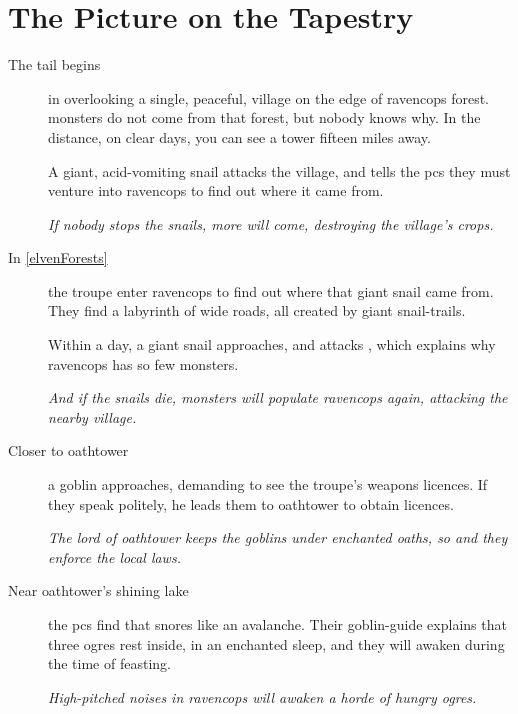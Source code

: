 \enchantedMap[b]

\section*{The Picture on the Tapestry}

\begin{multicols}{2}

\begin{description}
  \item[The tail begins] in  overlooking a single, peaceful, \gls{village} on the edge of \gls{ravencops} forest.
  \Glspl{monster} do not come from that forest, but nobody knows why.
  In the distance, on clear days, you can see a tower fifteen miles away.

  A giant, acid-vomiting snail attacks the \gls{village}, and  tells the \glspl{pc} they must venture into \gls{ravencops} to find out where it came from.

  \textit{If nobody stops the snails, more will come, destroying the \gls{village}'s crops.}

  \item[In \autoref{elvenForests}]
  the troupe enter \gls{ravencops} to find out where that giant snail came from.
  They find a labyrinth of wide roads, all created by giant snail-trails.

  Within a day, a giant snail approaches, and attacks , which explains why \gls{ravencops} has so few monsters.

  \textit{And if the snails die, \glspl{monster} will populate \gls{ravencops} again, attacking the nearby \gls{village}.}

  \item[Closer to \gls{oathtower}]
  a goblin approaches, demanding to see the troupe's weapons licences.
  If they speak politely, he leads them to \gls{oathtower} to obtain licences.

  \textit{The lord of \gls{oathtower} keeps the goblins under enchanted oaths, so and they enforce the local laws.}

  \item[Near \gls{oathtower}'s shining lake]
  the \glspl{pc} find  that snores like an avalanche.
  Their goblin-guide explains that three \glspl{ogre} rest inside, in an enchanted sleep, and they will awaken during the time of feasting.

  \textit{High-pitched noises in \gls{ravencops} will awaken a horde of hungry \glspl{ogre}.}


\end{description}
\end{multicols}
